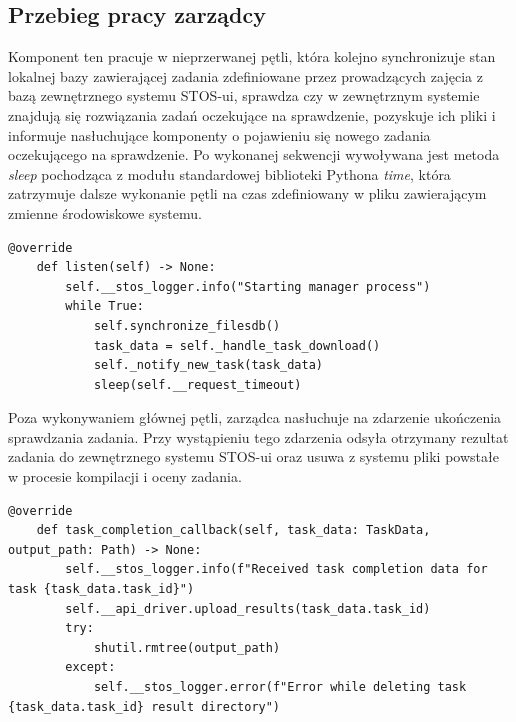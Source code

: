 \subsection{Przebieg pracy zarządcy}
Komponent ten pracuje w nieprzerwanej pętli, która kolejno synchronizuje stan lokalnej bazy zawierającej zadania zdefiniowane przez prowadzących zajęcia z bazą zewnętrznego systemu STOS-ui, sprawdza czy w zewnętrznym systemie znajdują się rozwiązania zadań oczekujące na sprawdzenie, pozyskuje ich pliki i informuje nasłuchujące komponenty o pojawieniu się nowego zadania oczekującego na sprawdzenie. Po wykonanej sekwencji wywoływana jest metoda \textit{sleep} pochodząca z modułu standardowej biblioteki Pythona \textit{time}\cite{pythonTime}, która zatrzymuje dalsze wykonanie pętli na czas zdefiniowany w pliku zawierającym zmienne środowiskowe systemu.
\lstset{style=python}
\begin{lstlisting}[caption = {Implementacja metody listen.}]
    @override
    def listen(self) -> None:
        self.__stos_logger.info("Starting manager process")
        while True:
            self.synchronize_filesdb()
            task_data = self._handle_task_download()
            self._notify_new_task(task_data)
            sleep(self.__request_timeout)
\end{lstlisting}
Poza wykonywaniem głównej pętli, zarządca nasłuchuje na zdarzenie ukończenia sprawdzania zadania. Przy wystąpieniu tego zdarzenia odsyła otrzymany rezultat zadania do zewnętrznego systemu STOS-ui oraz usuwa z systemu pliki powstałe w procesie kompilacji i oceny zadania.
\lstset{style=python}
\begin{lstlisting}[caption = {Implementacja metody wywoływanej przy zdarzeniu ukończenia sprawdzania zadania.}]
    @override
    def task_completion_callback(self, task_data: TaskData, output_path: Path) -> None:
        self.__stos_logger.info(f"Received task completion data for task {task_data.task_id}")
        self.__api_driver.upload_results(task_data.task_id)
        try:
            shutil.rmtree(output_path)
        except:
            self.__stos_logger.error(f"Error while deleting task {task_data.task_id} result directory")
\end{lstlisting}
